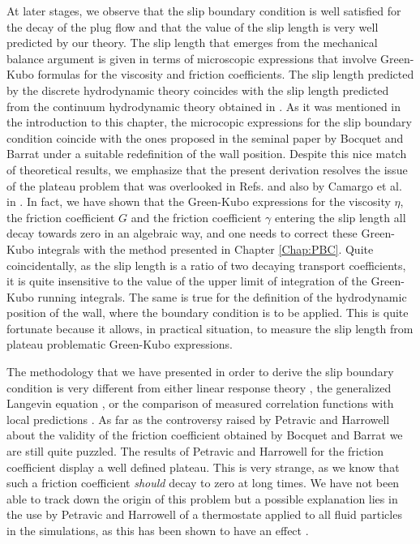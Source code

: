 \documentclass[b5paper,openright,10pt]{book}
\begin{document}
At later stages,  we observe that the slip boundary  condition is well
satisfied for  the decay of  the plug flow and  that the value  of the
slip length is very well predicted by our theory. The slip length that
emerges  from the  mechanical balance  argument is  given in  terms of
microscopic  expressions  that  involve Green-Kubo  formulas  for  the
viscosity and friction coefficients. The  slip length predicted by the
discrete hydrodynamic theory coincides  with the slip length predicted
from the  continuum hydrodynamic theory obtained in \cite{CamargoBC2018}.
As it was mentioned in the introduction to this chapter, the microcopic expressions for the slip
boundary  condition coincide  with the  ones proposed  in the  seminal
paper  by Bocquet  and Barrat  \cite{Bocquet1994,Bocquet2013} under  a
suitable redefinition of the wall position. Despite this nice match of
theoretical results, we emphasize that the present derivation resolves
the  issue  of  the  plateau  problem that  was  overlooked  in  Refs.
\cite{Bocquet1994,Bocquet2013} and also by Camargo et al. in \cite{CamargoBC2018}. In fact, we
have shown that  the Green-Kubo expressions for  the viscosity $\eta$,
the  friction coefficient  $G$ and  the friction  coefficient $\gamma$
entering the slip  length all decay towards zero in  an algebraic way,
and one  needs to correct  these Green-Kubo integrals with  the method
presented in Chapter \ref{Chap:PBC}.  Quite coincidentally,  as the slip length is a
ratio of two decaying transport  coefficients, it is quite insensitive
to  the value  of the  upper limit  of integration  of the  Green-Kubo
running  integrals.  The  same  is  true for  the  definition  of  the
hydrodynamic position of the wall,  where the boundary condition is to
be applied.  This is quite  fortunate because it allows,  in practical
situation,  to  measure  the  slip  length  from  plateau  problematic
Green-Kubo expressions.

The methodology  that we have  presented in  order to derive  the slip
boundary  condition  is very  different  from  either linear  response
theory  \cite{Bocquet1994,Petravic2007},   the  generalized  Langevin
equation \cite{Hansen2011}, or the  comparison of measured correlation
functions with local  predictions \cite{Bocquet1993,Chen2015}.  As far
as the controversy raised by Petravic and Harrowell about the validity
of  the friction  coefficient obtained  by Bocquet  and Barrat  we are
still quite  puzzled. The  results of Petravic  and Harrowell  for the
friction  coefficient display  a well  defined plateau.   This is  very
strange, as we  know that such a  friction coefficient \textit{should}
decay to zero at long times.  We  have not been able to track down the
origin of this  problem but a possible explanation lies  in the use by
Petravic and Harrowell of a thermostate applied to all fluid particles
in  the  simulations,  as  this  has been  shown  to  have  an  effect
\cite{AlizadehPahlavan2011}.
\end{document}
